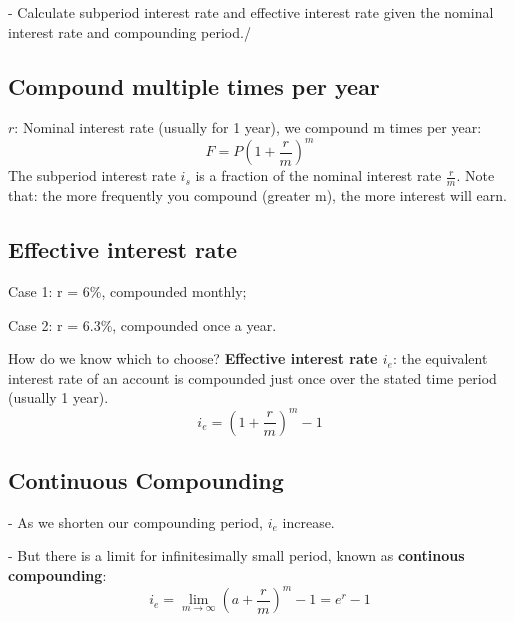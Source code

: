\documentclass{article}
\begin{document}
- Calculate subperiod interest rate and effective interest rate given the nominal interest rate and compounding period./

\subsection*{Compound multiple times per year}

$r$: Nominal interest rate (usually for 1 year), we compound m times per year:
\[F = P(1+\frac{r}{m})^m\]
The subperiod interest rate $i_s$ is a fraction of the nominal interest rate $\frac{r}{m}$.
Note that: the more frequently you compound (greater m), the more interest will earn. 


\subsection*{Effective interest rate}

Case 1: r = 6\%, compounded monthly; 

Case 2: r = 6.3\%, compounded once a year.

How do we know which to choose?
\textbf{Effective interest rate $i_e$}: the equivalent interest rate of an account is compounded just once over the stated time period (usually 1 year).  
\[ i_e = (1+\frac{r}{m})^m - 1\]

\subsection*{Continuous Compounding}
- As we shorten our compounding period, $i_e$ increase.

- But there is a limit for infinitesimally small period, known as \textbf{continous compounding}:
\[i_e = \lim_{m\to\infty}(a+\frac{r}{m})^m - 1 = e^r -1\]
\end{document}

